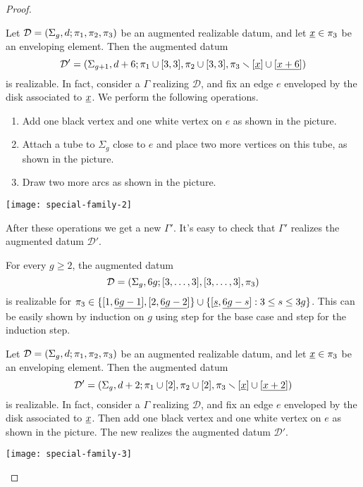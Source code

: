\documentclass{article}
\begin{document}
\begin{proof}
\begin{manycases}
\case Let $\mathcal{D}=\left(\Sigma_g,d;\pi_1,\pi_2,\pi_3\right)$ be an augmented realizable datum, and let $\underline{x}\in\pi_3$ be an enveloping element. Then the augmented datum
\[
\mathcal{D}'=\left(\Sigma_{g+1},d+6;\pi_1\cup[3,3],\pi_2\cup[3,3],\pi_3\smallsetminus[\underline{x}]\cup[\underline{x+6}]\right)
\]
is realizable. In fact, consider a \dessin{} $\Gamma$ realizing $\mathcal{D}$, and fix an edge $e$ enveloped by the disk associated to $\underline{x}$. We perform the following operations.
\begin{enumerate}
\item Add one black vertex and one white vertex on $e$ as shown in the picture.
\item Attach a tube to $\Sigma_g$ close to $e$ and place two more vertices on this tube, as shown in the picture.
\item Draw two more arcs as shown in the picture.
\end{enumerate}
\begin{center}
\texttt{[image: special-family-2]}
\end{center}
After these operations we get a new \dessin{} $\Gamma'$. It's easy to check that $\Gamma'$ realizes the augmented datum $\mathcal{D}'$.

\case For every $g\ge 2$, the augmented datum
\[
\mathcal{D}=\left(\Sigma_g,6g;[3,\ldots,3],[3,\ldots,3],\pi_3\right)
\]
is realizable for $\pi_3\in\{[1,\underline{6g-1}],[2,\underline{6g-2}]\}\cup\{[\underline{s},\underline{6g-s}]:3\le s\le 3g\}$. This can be easily shown by induction on $g$ using step  for the base case and step  for the induction step.

Let $\mathcal{D}=\left(\Sigma_g,d;\pi_1,\pi_2,\pi_3\right)$ be an augmented realizable datum, and let $\underline{x}\in\pi_3$ be an enveloping element. Then the augmented datum
\[
\mathcal{D}'=\left(\Sigma_g,d+2;\pi_1\cup[2],\pi_2\cup[2],\pi_3\smallsetminus[\underline{x}]\cup[\underline{x+2}]\right)
\]
is realizable. In fact, consider a \dessin{} $\Gamma$ realizing $\mathcal{D}$, and fix an edge $e$ enveloped by the disk associated to $\underline{x}$. Then add one black vertex and one white vertex on $e$ as shown in the picture. The new \dessin{} realizes the augmented datum $\mathcal{D'}$.
\tcblower
\begin{center}
\texttt{[image: special-family-3]}
\end{center}


\end{manycases}
\end{proof}
\end{document}
